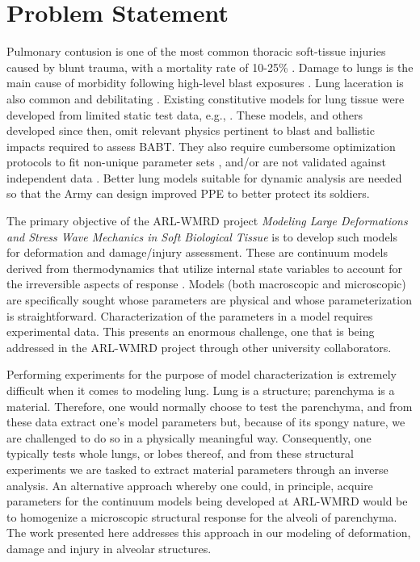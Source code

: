\section{Problem Statement}

Pulmonary contusion is one of the most common thoracic soft-tissue injuries caused by blunt trauma, with a mortality rate of 10-25\% \citep{Stitzeletal05}.  Damage to lungs is the main cause of morbidity following high-level blast exposures \citep{Stuhmilleretal88}.  Lung laceration is also common and debilitating \citep{VlessisTrunkey97}.  Existing constitutive models for lung tissue were developed from limited static test data, e.g., \cite{Fungetal78,Vawteretal79,Vawter80}.  These models, and others developed since then, omit relevant physics pertinent to blast and ballistic impacts required to assess BABT.  They also require cumbersome optimization protocols to fit non-unique parameter sets \citep{Gayziketal07,Gayziketal11}, and\slash or are not validated against independent data \citep{Yuenetal08}.  Better lung models suitable for dynamic analysis are needed so that the Army can design improved PPE to better protect its soldiers.

The primary objective of the ARL-WMRD project \textit{Modeling Large Deformations and Stress Wave Mechanics in Soft Biological Tissue\/} is to develop such models for deformation and damage\slash injury assessment.  These are continuum models derived from thermo\-dynamics that utilize internal state variables to account for the irreversible aspects of response \cite{ClaytonFreed19,ClaytonFreed20}.  Models (both macro\-scopic and micro\-scopic) are specifically sought whose parameters are physical and whose parameterization is straightforward.  Characterization of the parameters in a model requires experimental data.  This presents an enormous challenge, one that is being addressed in the ARL-WMRD project through other university collaborators.  

Performing experiments for the purpose of model characterization is extremely difficult when it comes to modeling lung.  Lung is a structure; parenchyma is a material.  Therefore, one would normally choose to test the parenchyma, and from these data extract one's model parameters but, because of its spongy nature, we are challenged to do so in a physically meaningful way.  Consequently, one typically tests whole lungs, or lobes thereof, and from these structural experiments we are tasked to extract material parameters through an inverse analysis.  An alternative approach whereby one could, in principle, acquire parameters for the continuum models being developed at ARL-WMRD would be to homo\-genize a microscopic structural response for the alveoli of parenchyma.  The work presented here addresses this approach in our modeling of deformation, damage and injury in alveolar structures.

